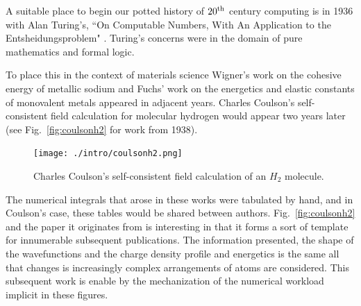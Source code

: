 

A suitable place to begin our potted history of $20^{\rm th}$
century computing is in 1936 with Alan Turing's, ``On Computable Numbers, 
With An Application to the Entsheidungsproblem"
\cite{turing36a}. Turing's concerns were in the domain of pure mathematics and
formal logic. 

To place this in the context of materials science Wigner's work on
the cohesive energy of metallic sodium \cite{wigner33,bouckaert36} and Fuchs' work on
the energetics and elastic constants of monovalent metals \cite{fuchs36} appeared in 
adjacent years.
Charles Coulson's self-consistent field calculation for molecular hydrogen would appear 
two years later \cite{coulson38} (see Fig.~\ref{fig:coulsonh2} for work from 1938). 
%
\begin{figure}
\begin{center}
\texttt{[image: ./intro/coulsonh2.png]}
\caption{Charles Coulson's self-consistent field calculation of an $H_2$ 
         molecule.\label{fig:coulson2}}
\end{center}
\end{figure}
%
The numerical integrals that arose in these 
works were tabulated by hand, and in Coulson's case, these tables 
would be shared between authors. Fig.~\ref{fig:coulsonh2} and the paper it originates
from is interesting in that it forms a sort of template for innumerable subsequent publications.
The information presented, the shape of the wavefunctions and the charge density
profile and energetics is the same all that changes is
increasingly complex arrangements of atoms are considered. This subsequent work is enable
by the mechanization of the numerical workload implicit in these figures. 


